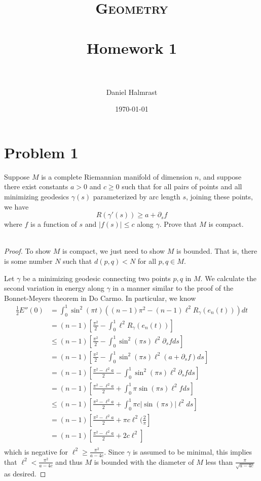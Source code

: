 \documentclass[fontsize=11pt]{scrartcl} %
\title{	
\normalfont \normalsize 
\textsc{Geometry} \\ [25pt] %
\horrule{0.5pt} \\[0.4cm] %
\huge Homework 1 \\ %
\horrule{2pt} \\[0.5cm] %
}
\author{Daniel Halmrast} %
\date{\normalsize\today} %
\numberwithin{equation}{section} %
\numberwithin{figure}{section} %
\numberwithin{table}{section} %
\begin{document}
\maketitle %

\section*{Problem 1} %
Suppose $M$ is a complete Riemannian manifold of dimension $n$, and suppose
there exist constants $a>0$ and $c\geq 0$ such that for all pairs of points and
all minimizing geodesics $\gamma(s)$ parameterized by arc length $s$, joining
these points, we have
\[
    R(\gamma'(s))\geq a + \partial_s f
\]
where $f$ is a function of $s$ and $|f(s)|\leq c$ along $\gamma$. Prove that $M$
is compact.
\\
\\
\begin{proof}
    To show $M$ is compact, we just need to show $M$ is bounded. That is, there
    is some number $N$ such that $d(p,q)<N$ for all $p,q\in M$.

    Let $\gamma$ be a minimizing geodesic connecting two points $p,q$ in $M$. We
    calculate the second variation in energy along $\gamma$ in a manner similar
    to the proof of the Bonnet-Meyers theorem in Do Carmo. In particular, we
    know
    \[
\begin{aligned}
    \frac{1}{2}E''(0) &= \int_0^1\sin^2(\pi t)((n-1)\pi^2 - (n-1)\ell^2
    R_{\gamma}(e_n(t)))dt\\
    &=(n-1)\left[ \frac{\pi^2}{2}- \int_0^1 \ell^2R_{\gamma}(e_n(t))\right]\\
    &\leq (n-1)\left[ \frac{\pi^2}{2} - \int_0^1\sin^2(\pi s)\ell^2 \partial_s f
    ds\right]\\
    &= (n-1)\left[ \frac{\pi^2}{2} - \int_0^1\sin^2(\pi s)\ell^2 (a+ \partial_s
        f) ds\right]\\
    &= (n-1)\left[ \frac{\pi^2-\ell^2a}{2} - \int_0^1\sin^2(\pi s)\ell^2\partial_s
    f ds\right]\\
    &= (n-1)\left[ \frac{\pi^2-\ell^2a}{2} + \int_0^1\pi\sin(\pi s)\ell^2
    f ds\right]\\
    &\leq (n-1)\left[ \frac{\pi^2-\ell^2a}{2} + \int_0^1\pi c|\sin(\pi s)|\ell^2
    ds\right]\\
    &= (n-1)\left[ \frac{\pi^2-\ell^2a}{2} + \pi c\ell^2(\frac{2}{\pi}\right]\\
    &= (n-1)\left[ \frac{\pi^2-\ell^2a}{2} + 2c\ell^2\right]\\
\end{aligned}
    \]
    which is negative for $\ell^2 \geq \frac{\pi^2}{a-4c}$. Since $\gamma$ is
    assumed to be minimal, this implies that $\ell^2 < \frac{\pi^2}{a-4c}$ and
    thus $M$ is bounded with the diameter of $M$ less than
    $\frac{\pi}{\sqrt{a-4c}}$ as desired.
\end{proof}
\end{document}
